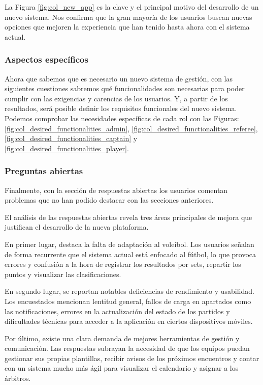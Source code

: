 La Figura \ref{fig:col_new_app} es la clave y el principal motivo del desarrollo de un nuevo sistema. Nos confirma que la gran mayoría de los usuarios buscan nuevas opciones que mejoren la experiencia que han tenido hasta ahora con el sistema actual.

\subsubsection*{Aspectos específicos}

Ahora que sabemos que es necesario un nuevo sistema de gestión, con las siguientes cuestiones sabremos qué funcionalidades son necesarias para poder cumplir con las exigencias y carencias de los usuarios. Y, a partir de los resultados, será posible definir los requisitos funcionales del nuevo sistema. Podemos comprobar las necesidades específicas de cada rol con las Figuras: \ref{fig:col_desired_functionalities_admin}, \ref{fig:col_desired_functionalities_referee}, \ref{fig:col_desired_functionalities_captain} y \ref{fig:col_desired_functionalities_player}.



\subsubsection*{Preguntas abiertas}

Finalmente, con la sección de respuestas abiertas los usuarios comentan problemas que no han podido destacar con las secciones anteriores.

El análisis de las respuestas abiertas revela tres áreas principales de mejora que justifican el desarrollo de la nueva plataforma.

En primer lugar, destaca la falta de adaptación al voleibol. Los usuarios señalan de forma recurrente que el sistema actual está enfocado al fútbol, lo que provoca errores y confusión a la hora de registrar los resultados por sets, repartir los puntos y visualizar las clasificaciones.

En segundo lugar, se reportan notables deficiencias de rendimiento y usabilidad. Los encuestados mencionan lentitud general, fallos de carga en apartados como las notificaciones, errores en la actualización del estado de los partidos y dificultades técnicas para acceder a la aplicación en ciertos dispositivos móviles.

Por último, existe una clara demanda de mejores herramientas de gestión y comunicación. Las respuestas subrayan la necesidad de que los equipos puedan gestionar sus propias plantillas, recibir avisos de los próximos encuentros y contar con un sistema mucho más ágil para visualizar el calendario y asignar a los árbitros.

